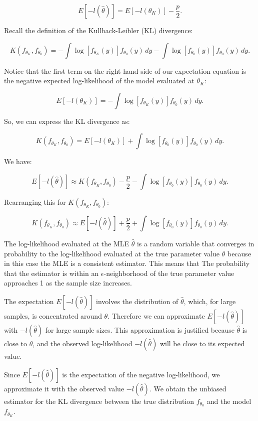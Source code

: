\documentclass[
11pt, %
oneside, %
english, %
singlespacing, %
]{macthesis} %
\begin{document}
\[
E[-l(\hat{\theta})] = E[-l(\theta_K)] - \frac{p}{2}.
\]

Recall the definition of the Kullback-Leibler (KL) divergence:

\[ 
K(f_{\theta_K}, f_{\theta_0}) = -\int \log[f_{\theta_K}(y)] f_{\theta_0}(y) \, dy - \int \log[f_{\theta_0}(y)] f_{\theta_0}(y) \, dy.
\]

Notice that the first term on the right-hand side of our expectation equation is the negative expected log-likelihood of the model evaluated at \(\theta_K\):

\[ 
E[-l(\theta_K)] = -\int \log[f_{\theta_K}(y)] f_{\theta_0}(y) \, dy. 
\]

So, we can express the KL divergence as:

\[ 
K(f_{\theta_K}, f_{\theta_0}) = E[-l(\theta_K)] + \int \log[f_{\theta_0}(y)] f_{\theta_0}(y) \, dy. 
\]

We have:

\[
E[-l(\hat{\theta})] \approx K(f_{\theta_K}, f_{\theta_0}) - \frac{p}{2} - \int \log[f_{\theta_0}(y)] f_{\theta_0}(y) \, dy. 
\]

Rearranging this for \(K(f_{\theta_K}, f_{\theta_0})\):

\[ 
K(f_{\theta_K}, f_{\theta_0}) \approx E[-l(\hat{\theta})] + \frac{p}{2} + \int \log[f_{\theta_0}(y)] f_{\theta_0}(y) \, dy. 
\]

The log-likelihood evaluated at the MLE \(\hat{\theta}\) is a random variable that converges in probability to the log-likelihood evaluated at the true parameter value \(\theta\) because in this case the MLE is a consistent estimator. This means that The probability that the estimator is within an
\(\epsilon\)-neighborhood of the true parameter value approaches 1 as the sample size increases.

The expectation \(E[-l(\hat{\theta})]\) involves the distribution of \(\hat{\theta}\), which, for large samples, is concentrated around \(\theta\). Therefore we can approximate \(E[-l(\hat{\theta})]\) with \(-l(\hat{\theta})\) for large sample sizes. This approximation is justified because \(\hat{\theta}\) is close to \(\theta\), and the observed log-likelihood \(-l(\hat{\theta})\) will be close to its expected value.

Since \(E[-l(\hat{\theta})]\) is the expectation of the negative log-likelihood, we approximate it with the observed value \(-l(\hat{\theta})\). We obtain the unbiased estimator for the KL divergence between the true distribution \(f_{\theta_0}\) and the model \(f_{\theta_K}\).
\end{document}
